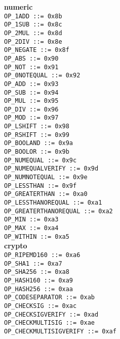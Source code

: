 \documentclass{article}
\begin{document}
\begin{multicols}{3}
\textbf{\centering numeric} \\
\texttt{OP\_1ADD ::= 0x8b  } \\
\texttt{OP\_1SUB ::= 0x8c  } \\
\texttt{OP\_2MUL ::= 0x8d  } \\
\texttt{OP\_2DIV ::= 0x8e  } \\
\texttt{OP\_NEGATE ::= 0x8f  } \\
\texttt{OP\_ABS ::= 0x90  } \\
\texttt{OP\_NOT ::= 0x91  } \\
\texttt{OP\_0NOTEQUAL ::= 0x92  } \\
\texttt{OP\_ADD ::= 0x93  } \\
\texttt{OP\_SUB ::= 0x94  } \\
\texttt{OP\_MUL ::= 0x95  } \\
\texttt{OP\_DIV ::= 0x96  } \\
\texttt{OP\_MOD ::= 0x97  } \\
\texttt{OP\_LSHIFT ::= 0x98  } \\
\texttt{OP\_RSHIFT ::= 0x99  } \\
\texttt{OP\_BOOLAND ::= 0x9a  } \\
\texttt{OP\_BOOLOR ::= 0x9b  } \\
\texttt{OP\_NUMEQUAL ::= 0x9c  } \\
\texttt{OP\_NUMEQUALVERIFY ::= 0x9d  } \\
\texttt{OP\_NUMNOTEQUAL ::= 0x9e  } \\
\texttt{OP\_LESSTHAN ::= 0x9f  } \\
\texttt{OP\_GREATERTHAN ::= 0xa0  } \\
\texttt{OP\_LESSTHANOREQUAL ::= 0xa1  } \\
\texttt{OP\_GREATERTHANOREQUAL ::= 0xa2  } \\
\texttt{OP\_MIN ::= 0xa3  } \\
\texttt{OP\_MAX ::= 0xa4  } \\
\texttt{OP\_WITHIN ::= 0xa5  } \\

\textbf{\centering crypto} \\
\texttt{OP\_RIPEMD160 ::= 0xa6  } \\
\texttt{OP\_SHA1 ::= 0xa7  } \\
\texttt{OP\_SHA256 ::= 0xa8  } \\
\texttt{OP\_HASH160 ::= 0xa9  } \\
\texttt{OP\_HASH256 ::= 0xaa  } \\
\texttt{OP\_CODESEPARATOR ::= 0xab  } \\
\texttt{OP\_CHECKSIG ::= 0xac  } \\
\texttt{OP\_CHECKSIGVERIFY ::= 0xad  } \\
\texttt{OP\_CHECKMULTISIG ::= 0xae  } \\
\texttt{OP\_CHECKMULTISIGVERIFY ::= 0xaf  } \\


\end{multicols}
\end{document}
